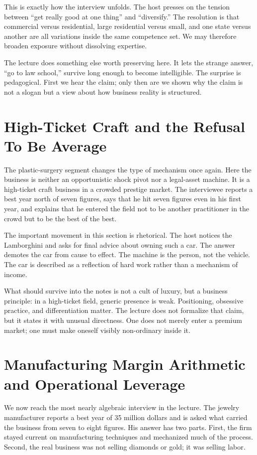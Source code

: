This is exactly how the interview unfolds. The host presses on the tension between ``get really good at one thing'' and ``diversify.'' The resolution is that commercial versus residential, large residential versus small, and one state versus another are all variations inside the same competence set. We may therefore broaden exposure without dissolving expertise.

The lecture does something else worth preserving here. It lets the strange answer, ``go to law school,'' survive long enough to become intelligible. The surprise is pedagogical. First we hear the claim; only then are we shown why the claim is not a slogan but a view about how business reality is structured.

\section{High-Ticket Craft and the Refusal To Be Average}

The plastic-surgery segment changes the type of mechanism once again. Here the business is neither an opportunistic shock pivot nor a legal-asset machine. It is a high-ticket craft business in a crowded prestige market. The interviewee reports a best year north of seven figures, says that he hit seven figures even in his first year, and explains that he entered the field not to be another practitioner in the crowd but to be the best of the best.

The important movement in this section is rhetorical. The host notices the Lamborghini and asks for final advice about owning such a car. The answer demotes the car from cause to effect. The machine is the person, not the vehicle. The car is described as a reflection of hard work rather than a mechanism of income.

What should survive into the notes is not a cult of luxury, but a business principle: in a high-ticket field, generic presence is weak. Positioning, obsessive practice, and differentiation matter. The lecture does not formalize that claim, but it states it with unusual directness. One does not merely enter a premium market; one must make oneself visibly non-ordinary inside it.

\section{Manufacturing Margin Arithmetic and Operational Leverage}

We now reach the most nearly algebraic interview in the lecture. The jewelry manufacturer reports a best year of 35 million dollars and is asked what carried the business from seven to eight figures. His answer has two parts. First, the firm stayed current on manufacturing techniques and mechanized much of the process. Second, the real business was not selling diamonds or gold; it was selling labor.


